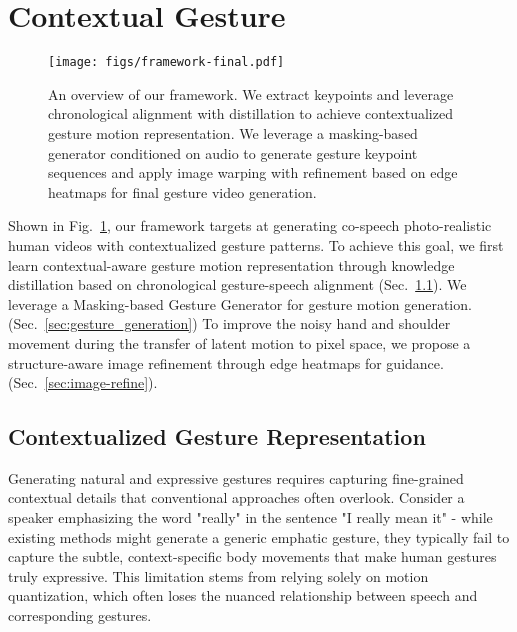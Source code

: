 

\section{Contextual Gesture}
\begin{figure}
    \texttt{[image: figs/framework-final.pdf]}
    \vspace{-1em}
    \caption{An overview of our framework. We extract keypoints and leverage chronological alignment with distillation to achieve contextualized gesture motion representation. We leverage a masking-based generator conditioned on audio to generate gesture keypoint sequences and apply image warping with refinement based on edge heatmaps for final gesture video generation. }
    \label{fig:overview}
    \vspace{-5mm}
\end{figure}

Shown in Fig.~\ref{fig:overview},  our framework targets at generating co-speech photo-realistic human videos with contextualized gesture patterns. To achieve this goal, we first learn contextual-aware gesture motion representation through knowledge distillation based on chronological gesture-speech alignment (Sec.~\ref{sec:gesture_representation}). We leverage a Masking-based Gesture Generator for gesture motion generation. (Sec.~\ref{sec:gesture_generation}) To improve the noisy hand and shoulder movement during the transfer of latent motion to pixel space, we propose a structure-aware image refinement through edge heatmaps for guidance. (Sec.~\ref{sec:image-refine}). 


\vspace{-0.2cm}
\subsection{Contextualized Gesture Representation}
\label{sec:gesture_representation}

Generating natural and expressive gestures requires capturing fine-grained contextual details that conventional approaches often overlook. Consider a speaker emphasizing the word "really" in the sentence "I really mean it" - while existing methods might generate a generic emphatic gesture, they typically fail to capture the subtle, context-specific body movements that make human gestures truly expressive. This limitation stems from relying solely on motion quantization, which often loses the nuanced relationship between speech and corresponding gestures.

